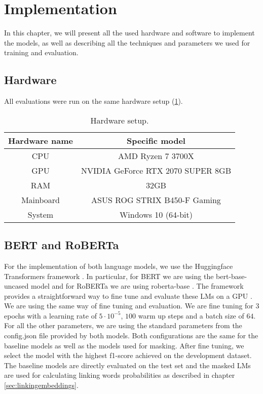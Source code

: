 \section{Implementation}
In this chapter, we will present all the used hardware and software to implement the models, as well as describing all the techniques and parameters we used for training and evaluation.

\subsection{Hardware}
All evaluations were run on the same hardware setup (\ref{fig:hardware1}).

\begin{table}[H]
  \begin{center}
   	\begin{tabular}{|| c | c ||}
   	\hline
   	Hardware name & Specific model \\
   	\hline\hline
   	CPU & AMD Ryzen 7 3700X \\
 	\hline
 	GPU & NVIDIA GeForce RTX 2070 SUPER 8GB \\
 	\hline
 	RAM & 32GB \\
 	\hline
 	Mainboard & ASUS ROG STRIX B450-F Gaming \\
 	\hline
 	System & Windows 10 (64-bit) \\
 	\hline
	\end{tabular}
  \end{center}
  \caption{Hardware setup.}%
  \label{fig:hardware1}
\end{table}

\subsection{BERT and RoBERTa} \label{sec:secbert}
For the implementation of both language models, we use the Huggingface Transformers framework \cite{transformers}. In particular, for BERT we are using the bert-base-uncased model \cite{bertbaseuncased} and for RoBERTa we are using roberta-base \cite{robertabase}. The framework provides a straightforward way to fine tune and evaluate these LMs on a GPU \cite{berttraining}. We are using the same way of fine tuning and evaluation. We are fine tuning for $3$ epochs with a learning rate of $5 \cdot 10^{-5}$, $100$ warm up steps and a batch size of $64$. For all the other parameters, we are using the standard parameters from the config.json file provided by both models. Both configurations are the same for the baseline models as well as the models used for masking. After fine tuning, we select the model with the highest f1-score achieved on the development dataset. \\
The baseline models are directly evaluated on the test set and the masked LMs are used for calculating linking words probabilities as described in chapter \ref{sec:linkingembeddings}.

